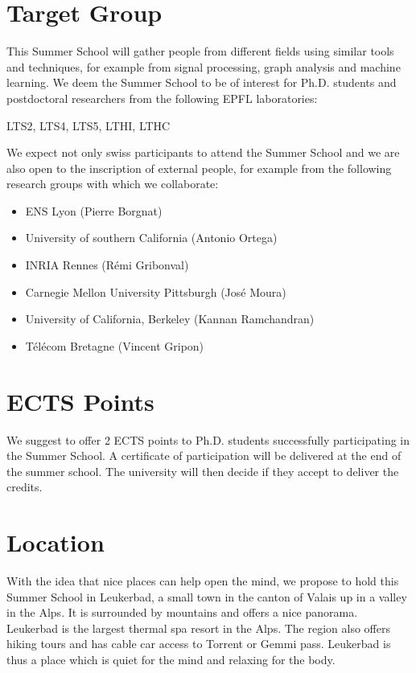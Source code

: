 \documentclass[a4paper]{scrartcl}
\begin{document}
\section{Target Group}
This Summer School will gather people from different fields using similar tools and techniques, for example from signal processing, graph analysis and machine learning. We deem the Summer School to be of interest for Ph.D. students and postdoctoral researchers from the following EPFL laboratories:
\begin{center}
LTS2, LTS4, LTS5, LTHI, LTHC
\end{center}
We expect not only swiss participants to attend the Summer School and we are also open to the inscription of external people, for example from the following research groups with which we collaborate:
\begin{itemize}
	\item ENS Lyon (Pierre Borgnat)
	\item University of southern California (Antonio Ortega)
	\item INRIA Rennes (Rémi Gribonval)
	\item Carnegie Mellon University Pittsburgh (José Moura)
	\item University of California, Berkeley (Kannan Ramchandran)
	\item Télécom Bretagne (Vincent Gripon)
\end{itemize}


\section{ECTS Points}
We suggest to offer 2 ECTS points to Ph.D. students successfully participating in the Summer School. A certificate of participation will be delivered at the end of the summer school. The university will then decide if they accept to deliver the credits.

\section{Location}
With the idea that nice places can help open the mind, we propose to hold this Summer School in Leukerbad, a small town in the canton of Valais up in a valley in the Alps. It is surrounded by mountains and offers a nice panorama. Leukerbad is the largest thermal spa resort in the Alps. The region also offers hiking tours and has cable car access to Torrent or Gemmi pass. Leukerbad is thus a place which is quiet for the mind and relaxing for the body. 
\end{document}
